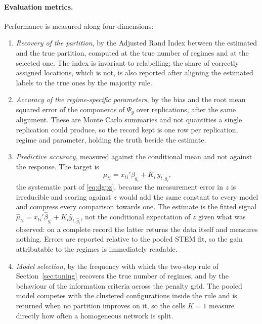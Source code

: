 \paragraph{Evaluation metrics.} Performance is measured along four dimensions:
\begin{enumerate}[leftmargin=*,itemsep=2pt,topsep=3pt]
  \item \emph{Recovery of the partition}, by the Adjusted Rand Index \citep{HubertArabie1985} between the estimated and the true partition, computed at the true number of regimes and at the selected one. The index is invariant to relabelling; the share of correctly assigned locations, which is not, is also reported after aligning the estimated labels to the true ones by the majority rule.
  \item \emph{Accuracy of the regime-specific parameters}, by the bias and the root mean squared error of the components of $\Psi_g$ over replications, after the same alignment. These are Monte Carlo summaries and not quantities a single replication could produce, so the record kept is one row per replication, regime and parameter, holding the truth beside the estimate.
  \item \emph{Predictive accuracy}, measured against the conditional mean and not against the response. The target is
  \begin{equation}
    \mu_{ti} = x_{ti}' \beta_{g_i} + K_i\, y_{t,g_i} ,
    \label{eq:signal}
  \end{equation}
  the systematic part of \eqref{eq:dgpz}, because the measurement error in $z$ is irreducible and scoring against $z$ would add the same constant to every model and compress every comparison towards one. The estimate is the fitted signal $\hat\mu_{ti} = x_{ti}' \hat\beta_{\hat g_i} + K_i \hat y_{t,\hat g_i}$, not the conditional expectation of $z$ given what was observed: on a complete record the latter returns the data itself and measures nothing. Errors are reported relative to the pooled STEM fit, so the gain attributable to the regimes is immediately readable.
  \item \emph{Model selection}, by the frequency with which the two-step rule of Section~\ref{sec:tuning} recovers the true number of regimes, and by the behaviour of the information criteria across the penalty grid. The pooled model competes with the clustered configurations inside the rule and is returned when no partition improves on it, so the cells $K = 1$ measure directly how often a homogeneous network is split.
\end{enumerate}


